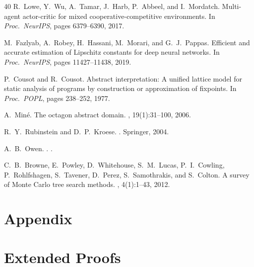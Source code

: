 \documentclass[11pt]{article}
\begin{document}
\begin{thebibliography}{40}
R.~Lowe, Y.~Wu, A.~Tamar, J.~Harb, P.~Abbeel, and I.~Mordatch.
\newblock Multi-agent actor-critic for mixed cooperative-competitive environments.
\newblock In {\em Proc.\ NeurIPS}, pages 6379--6390, 2017.

M.~Fazlyab, A.~Robey, H.~Hassani, M.~Morari, and G.~J.~Pappas.
\newblock Efficient and accurate estimation of {Lipschitz} constants for deep neural networks.
\newblock In {\em Proc.\ NeurIPS}, pages 11427--11438, 2019.

P.~Cousot and R.~Cousot.
\newblock Abstract interpretation: A unified lattice model for static analysis of programs by construction or approximation of fixpoints.
\newblock In {\em Proc.\ POPL}, pages 238--252, 1977.

A.~Min\'{e}.
\newblock The octagon abstract domain.
, 19(1):31--100, 2006.

R.~Y.~Rubinstein and D.~P.~Kroese.
.
\newblock Springer, 2004.

A.~B.~Owen.
.
.

C.~B.~Browne, E.~Powley, D.~Whitehouse, S.~M.~Lucas, P.~I.~Cowling, P.~Rohlfshagen, S.~Tavener, D.~Perez, S.~Samothrakis, and S.~Colton.
\newblock A survey of {Monte Carlo} tree search methods.
, 4(1):1--43, 2012.

\end{thebibliography}

\clearpage
\appendix
\setcounter{page}{1}
\renewcommand{\thepage}{A\arabic{page}}

\section*{Appendix}

\section{Extended Proofs}
\label{app:proofs}
\end{document}
